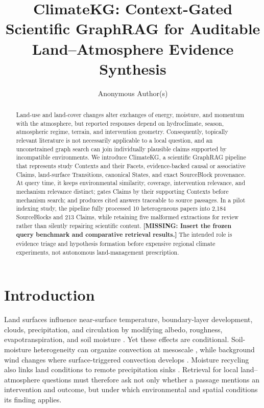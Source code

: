\documentclass{article}
\title{ClimateKG: Context-Gated Scientific GraphRAG for Auditable
Land--Atmosphere Evidence Synthesis}
\author{Anonymous Author(s)}
\newcommand{\missing}[1]{\textcolor{missingred}{\textbf{[MISSING: #1]}}}
\newcommand{\system}{ClimateKG}
\begin{document}
\maketitle

\begin{abstract}
Land-use and land-cover changes alter exchanges of energy, moisture, and
momentum with the atmosphere, but reported responses depend on hydroclimate,
season, atmospheric regime, terrain, and intervention geometry. Consequently,
topically relevant literature is not necessarily applicable to a local
question, and an unconstrained graph search can join individually plausible
claims supported by incompatible environments. We introduce \system{}, a
scientific GraphRAG pipeline that represents study Contexts and their Facets,
evidence-backed causal or associative Claims, land-surface Transitions,
canonical States, and exact SourceBlock provenance. At query time, it keeps
environmental similarity, coverage, intervention relevance, and mechanism
relevance distinct; gates Claims by their supporting Contexts before mechanism
search; and produces cited answers traceable to source passages. In a pilot
indexing study, the pipeline fully processed 10 heterogeneous papers into 2,184
SourceBlocks and 213 Claims, while retaining five malformed extractions for
review rather than silently repairing scientific content. \missing{Insert the
frozen query benchmark and comparative retrieval results.} The intended role
is evidence triage and hypothesis formation before expensive regional climate
experiments, not autonomous land-management prescription.
\end{abstract}

\section{Introduction}

Land surfaces influence near-surface temperature, boundary-layer development,
clouds, precipitation, and circulation by modifying albedo, roughness,
evapotranspiration, and soil moisture \citep{pielke2007,cao2020,spracklen2018}.
Yet these effects are conditional. Soil-moisture heterogeneity can organize
convection at mesoscale \citep{taylor2011}, while background wind changes where
surface-triggered convection develops \citep{froidevaux2014}. Moisture recycling
also links land conditions to remote precipitation sinks \citep{keys2012}.
Retrieval for local land--atmosphere questions must therefore ask not only
whether a passage mentions an intervention and outcome, but under which
environmental and spatial conditions its finding applies.
\end{document}
